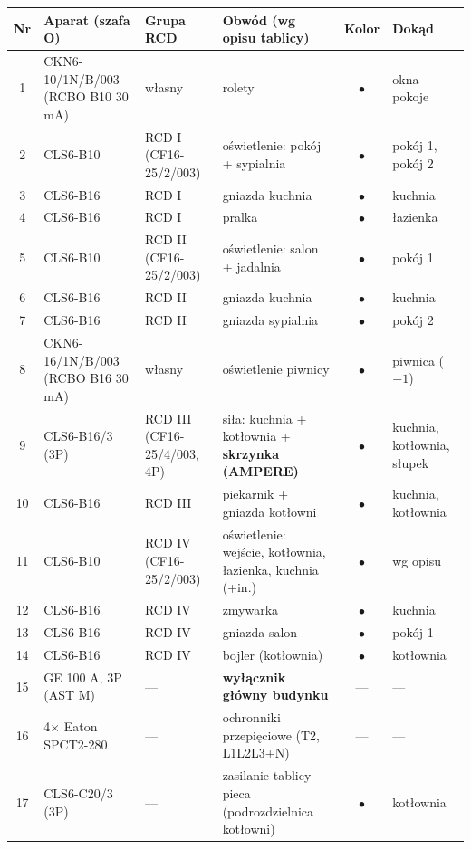 \documentclass[10pt,a4paper,landscape]{article}
\begin{document}
\begin{center}\scriptsize
\begin{tabular}{@{}c l l l c l@{}}
\toprule
\textbf{Nr} & \textbf{Aparat (szafa O)} & \textbf{Grupa RCD} & \textbf{Obwód (wg opisu tablicy)} & \textbf{Kolor} & \textbf{Dokąd}\\
\midrule
1 & CKN6-10/1N/B/003 (RCBO B10 30 mA) & własny & rolety & \textcolor{cSPEC}{$\bullet$} & okna pokoje\\
2 & CLS6-B10 & RCD I (CF16-25/2/003) & oświetlenie: pokój + sypialnia & \textcolor{cOSW}{$\bullet$} & pokój 1, pokój 2\\
3 & CLS6-B16 & RCD I & gniazda kuchnia & \textcolor{cGN}{$\bullet$} & kuchnia\\
4 & CLS6-B16 & RCD I & pralka & \textcolor{cGN}{$\bullet$} & łazienka\\
5 & CLS6-B10 & RCD II (CF16-25/2/003) & oświetlenie: salon + jadalnia & \textcolor{cOSW}{$\bullet$} & pokój 1\\
6 & CLS6-B16 & RCD II & gniazda kuchnia & \textcolor{cGN}{$\bullet$} & kuchnia\\
7 & CLS6-B16 & RCD II & gniazda sypialnia & \textcolor{cGN}{$\bullet$} & pokój 2\\
8 & CKN6-16/1N/B/003 (RCBO B16 30 mA) & własny & oświetlenie piwnicy & \textcolor{cOSW}{$\bullet$} & piwnica ($-1$)\\
9 & CLS6-B16/3 (3P) & RCD III (CF16-25/4/003, 4P) & siła: kuchnia + kotłownia + \textbf{skrzynka (AMPERE)} & \textcolor{c3F}{$\bullet$} & kuchnia, kotłownia, słupek\\
10 & CLS6-B16 & RCD III & piekarnik + gniazda kotłowni & \textcolor{cGN}{$\bullet$} & kuchnia, kotłownia\\
11 & CLS6-B10 & RCD IV (CF16-25/2/003) & oświetlenie: wejście, kotłownia, łazienka, kuchnia (+in.) & \textcolor{cOSW}{$\bullet$} & wg opisu\\
12 & CLS6-B16 & RCD IV & zmywarka & \textcolor{cGN}{$\bullet$} & kuchnia\\
13 & CLS6-B16 & RCD IV & gniazda salon & \textcolor{cGN}{$\bullet$} & pokój 1\\
14 & CLS6-B16 & RCD IV & bojler (kotłownia) & \textcolor{cGN}{$\bullet$} & kotłownia\\
15 & GE 100 A, 3P (AST M) & --- & \textbf{wyłącznik główny budynku} & --- & ---\\
16 & 4$\times$ Eaton SPCT2-280 & --- & ochronniki przepięciowe (T2, L1L2L3+N) & --- & ---\\
17 & CLS6-C20/3 (3P) & --- & zasilanie tablicy pieca (podrozdzielnica kotłowni) & \textcolor{c3F}{$\bullet$} & kotłownia\\

\end{tabular}
\end{center}
\end{document}
